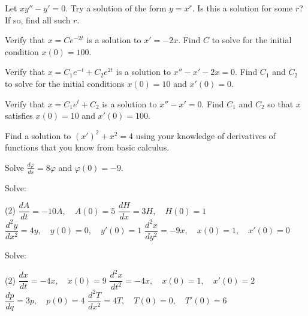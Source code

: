 \begin{exercise}\ansMark%
Let $xy'' - y' = 0$.  Try a solution of the form $y = x^r$.  Is this a
solution for some $r$?  If so, find all such $r$.
\end{exercise}

\begin{exercise}
Verify that $x = C e^{-2t}$ is a solution to $x' = -2x$.
Find $C$ to solve for the initial condition $x(0) = 100$.
\end{exercise}

\begin{exercise}
Verify that $x = C_1 e^{-t} + C_2 e^{2t}$ is a solution to $x'' - x' -2 x =
0$.  Find $C_1$ and $C_2$ to solve for the initial conditions $x(0) = 10$
and $x'(0) = 0$.
\end{exercise}

\begin{exercise}\ansMark%
Verify that $x=C_1e^t+C_2$ is a solution to $x''-x' = 0$.  Find $C_1$ and
$C_2$ so that $x$ satisfies $x(0) = 10$ and $x'(0) = 100$.
\end{exercise}

\begin{exercise}
Find a solution to
${(x')}^2 + x^2 = 4$
using your knowledge of derivatives of functions that you
know from basic calculus.
\end{exercise}

\begin{exercise}\ansMark%
Solve $\frac{d\varphi}{ds} = 8 \varphi$ and $\varphi(0) = -9$.
\end{exercise}

\begin{exercise}
Solve:
\begin{tasks}(2)
\task $\dfrac{dA}{dt} = -10 A, \quad A(0)=5$
\task $\dfrac{dH}{dx} = 3 H, \quad H(0)=1$
\task $\dfrac{d^2y}{dx^2} = 4 y, \quad y(0)=0, \quad y'(0)=1$
\task $\dfrac{d^2x}{dy^2} = -9 x, \quad x(0)=1, \quad x'(0)=0$
\end{tasks}
\end{exercise}

\begin{exercise}\ansMark%
Solve:
\begin{tasks}(2)
\task $\dfrac{dx}{dt} = -4x, \quad x(0)=9$
\task $\dfrac{d^2x}{dt^2} = -4x, \quad x(0)=1, \quad x'(0)=2$
\task $\dfrac{dp}{dq} = 3 p, \quad p(0)=4$
\task $\dfrac{d^2T}{dx^2} = 4 T, \quad T(0)=0, \quad T'(0)=6$
\end{tasks}
\end{exercise}

